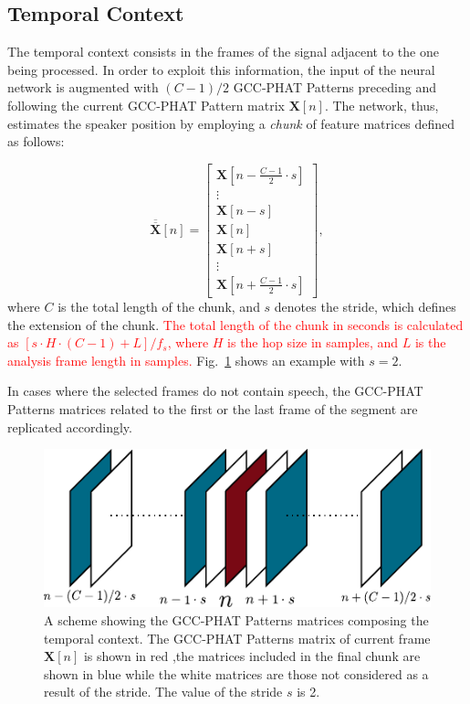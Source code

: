 \documentclass[review]{elsarticle}
\newcommand{\figref}[1]{Fig.~\ref{#1}}
\begin{document}
\subsection{Temporal Context}\label{sec:TEE}
The temporal context consists in the frames of the signal adjacent to the one being processed. In order to exploit this information, the input of the neural network  is augmented with $(C-1)/2$ GCC-PHAT Patterns preceding and following the current GCC-PHAT Pattern matrix $\mathbf{X}[n]$. The network, thus, estimates the speaker position by employing a \textit{chunk} of feature matrices defined as follows:

\begin{equation}
\overline{\overline{\mathbf{X}}}[n]= \left [ \begin{array}{c} 
\mathbf{X}[n -  \frac{C-1}{2} \cdot s]\\
\vdots\\
\mathbf{X}[n - s]\\
\mathbf{X}[n]\\
\mathbf{X}[n+s]\\
\vdots\\
\mathbf{X}[n + \frac{C-1}{2} \cdot s]
\end{array}
\right ],
\end{equation}
where $C$ is the total length of the chunk, and $s$ denotes the stride, which defines the extension of the chunk.  \textcolor{red}{The total length of the chunk in seconds is calculated as $\left [s\cdot H \cdot(C-1)+L \right ]/f_s$, where $H$ is the hop size in samples, and $L$ is the analysis frame length in samples.} \figref{fig:cxt_str} shows an example with $s=2$.

In cases where the selected frames do not contain speech, the GCC-PHAT Patterns matrices related to the first or the last frame of the segment are replicated accordingly.

\begin{figure}[t] 
	\centering
	\includegraphics[width=0.65\columnwidth]{imgs/cxt_str}
	\caption{A scheme showing the GCC-PHAT Patterns matrices composing the temporal context. The GCC-PHAT Patterns matrix of current frame $\mathbf{X}[n]$ is shown in red ,the matrices included in the final chunk are shown in blue while the white matrices are those not considered as a result of the stride. The value of the stride $s$ is 2.}
	\label{fig:cxt_str}
\end{figure} 
\end{document}
